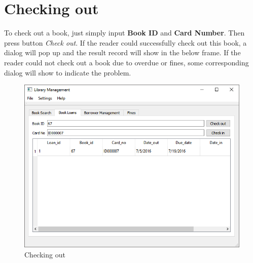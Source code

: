 \documentclass[a4paper, 12pt]{report}
\begin{document}
\pagebreak

\section*{Checking out}
To check out a book, just simply input \textbf{Book ID} and \textbf{Card Number}. Then press button \textit{Check out}. If the reader could successfully check out this book, a dialog will pop up and the result record will show in the below frame. If the reader could not check out a book due to overdue or fines, some corresponding dialog will show to indicate the problem.
\begin{figure}[H]
  \includegraphics[width=\textwidth, inner]{./screenshot/checking_out.png}
  \caption{Checking out}
\end{figure}

\pagebreak
\end{document}
